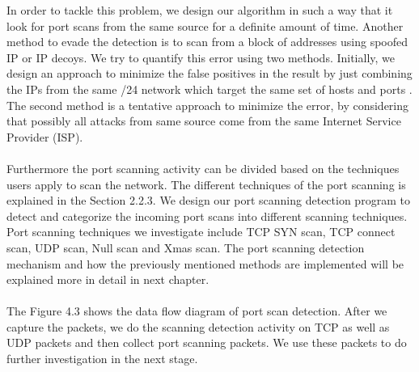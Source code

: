 In order to tackle this problem, we design our algorithm in such a way that it look for port scans from the same source for a definite amount of time. 
Another method to evade the detection is to scan from a block of addresses using spoofed IP or IP decoys.
We try to quantify this error using two methods.
Initially, we design an approach to minimize the false positives in the result by just combining the IPs from the same /24 network which target the same set of hosts and ports \cite{lee2003detection}.
The second method is a tentative approach to  minimize the error, by considering that possibly all attacks from same source come from the same Internet Service Provider (ISP).\\\\ 
Furthermore the port scanning activity can be divided based on the techniques users apply to scan the network.
The different techniques of the port scanning is explained in the Section 2.2.3.
We design our port scanning detection program to detect and categorize the incoming port scans into different scanning techniques.
Port scanning techniques we investigate include TCP SYN scan, TCP connect scan, UDP scan, Null scan and Xmas scan.
The port scanning detection mechanism and how the previously mentioned methods are implemented will be explained more in detail in next chapter.\\\\
The Figure 4.3 shows the data flow diagram of port scan detection.
After we capture the packets, we do the scanning detection activity on TCP as well as UDP packets and then collect port scanning packets.
We use these packets to do further investigation in the next stage.
